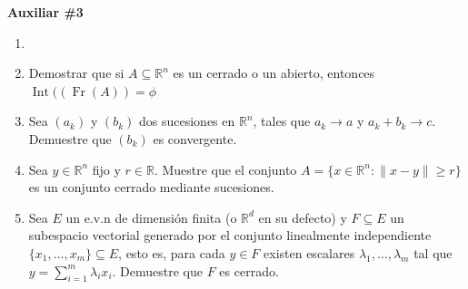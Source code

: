 \documentclass[letterpaper,11pt]{article}
\DeclareMathOperator{\inte}{Int}
\DeclareMathOperator{\fr}{Fr}
\newcommand{\R}{\mathbb{R}}
\newcommand{\norm}[1]{\lVert #1\rVert }
\begin{document}
\begin{center}
	\LARGE \bf{Auxiliar \#3}\\
\end{center}

\vspace{-1cm}
\begin{enumerate}\setlength{\itemsep}{0.4cm}	
\item[]

\item Demostrar que si $A\subseteq \mathbb{R}^n $ es un cerrado o un abierto, entonces $\inte((\fr(A))=\phi$

\item Sea $(a_k)$ y $(b_k)$ dos sucesiones en $\mathbb{R}^n$, tales que $a_k\rightarrow a$ y $a_k+b_k\rightarrow c$. Demuestre  que $(b_k)$ es convergente.

\item Sea $y\in\mathbb{R}^n$ fijo y $r\in\mathbb{R}$. Muestre que el conjunto $A=\{x\in\mathbb{R}^n:\norm{x-y}\geq r\}$ es un conjunto cerrado mediante sucesiones.

\item Sea $E$ un e.v.n de dimensión finita (o $\R^d$ en su defecto) y $F\subseteq E$ un subespacio vectorial generado por el conjunto linealmente independiente $\{x_1,\ldots,x_m\}\subseteq E$, esto es, para cada $y\in F$ existen escalares $\lambda_1,\ldots,\lambda_m$ tal que
$y=\sum_{i=1}^m\lambda_i x_i $. Demuestre que $F$ es cerrado.

\end{enumerate}	
\end{document}
